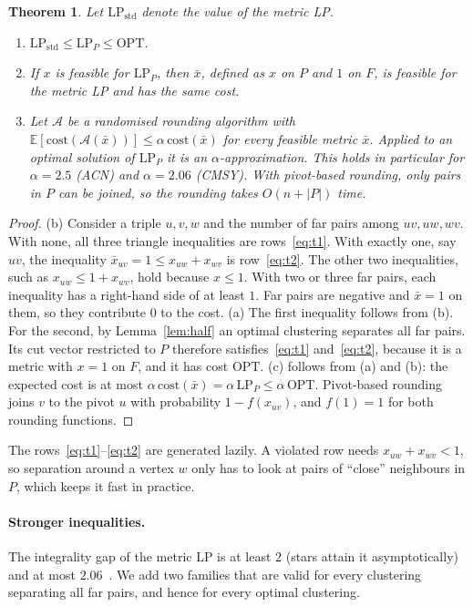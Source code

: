 \documentclass[11pt]{article}
\newtheorem{theorem}{Theorem}
\theoremstyle{definition}
\newcommand{\OPT}{\mathrm{OPT}}
\newcommand{\cost}{\mathrm{cost}}
\begin{document}
\begin{theorem}\label{thm:sparse}
Let $\mathrm{LP}_{\mathrm{std}}$ denote the value of the metric LP.
\begin{enumerate}
\item[(a)] $\mathrm{LP}_{\mathrm{std}}\le \mathrm{LP}_P\le\OPT$.
\item[(b)] If $x$ is feasible for $\mathrm{LP}_P$, then $\bar x$, defined as $x$ on
$P$ and $1$ on $F$, is feasible for the metric LP and has the same cost.
\item[(c)] Let $\mathcal A$ be a randomised rounding algorithm with
$\mathbb E[\cost(\mathcal A(\bar x))]\le\alpha\,\mathrm{cost}(\bar x)$ for every
feasible metric $\bar x$.  Applied to an optimal solution of $\mathrm{LP}_P$ it
is an $\alpha$-approximation.  This holds in particular for $\alpha=2.5$
(ACN) and $\alpha=2.06$ (CMSY).  With pivot-based rounding, only pairs in
$P$ can be joined, so the rounding takes $O(n+|P|)$ time.
\end{enumerate}
\end{theorem}
\begin{proof}
(b) Consider a triple $u,v,w$ and the number of far pairs among $uv,uw,wv$.
With none, all three triangle inequalities are rows~\eqref{eq:t1}.  With
exactly one, say $uv$, the inequality $\bar x_{uv}=1\le x_{uw}+x_{wv}$ is
row~\eqref{eq:t2}.  The other two inequalities, such as
$x_{uw}\le 1+x_{wv}$, hold because $x\le 1$.  With two or three far pairs, each
inequality has a right-hand side of at least $1$.  Far pairs are negative and
$\bar x=1$ on them, so they contribute $0$ to the cost.  (a) The first
inequality follows from (b).  For the second, by Lemma~\ref{lem:half} an
optimal clustering separates all far pairs.  Its cut vector restricted to $P$
therefore satisfies~\eqref{eq:t1} and~\eqref{eq:t2}, because it is a metric
with $x=1$ on $F$, and it has cost $\OPT$.  (c) follows from (a) and (b): the
expected cost is at most $\alpha\,\mathrm{cost}(\bar x)=\alpha\,\mathrm{LP}_P
\le\alpha\,\OPT$.  Pivot-based rounding joins $v$ to the pivot $u$ with
probability $1-f(x_{uv})$, and $f(1)=1$ for both rounding functions.
\end{proof}

The rows~\eqref{eq:t1}--\eqref{eq:t2} are generated lazily.  A violated row
needs $x_{uw}+x_{wv}<1$, so separation around a vertex $w$ only has to look at
pairs of ``close'' neighbours in $P$, which keeps it fast in practice.

\paragraph{Stronger inequalities.}  The integrality gap of the metric LP is
at least $2$ (stars attain it asymptotically) and at most
$2.06$~\citep{ChawlaMSY15}.  We add two families that are valid for every clustering
separating all far pairs, and hence for every optimal clustering.
\end{document}
